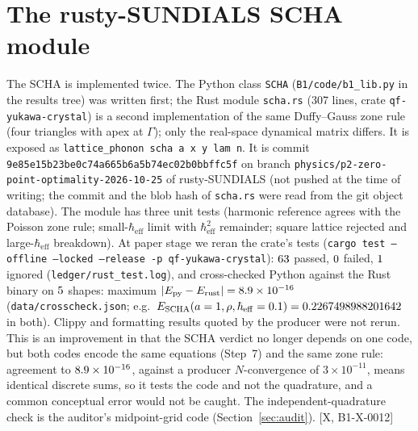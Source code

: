 \documentclass[10pt]{article}
\newcommand{\tier}[1]{\textsf{[#1]}}
\newcommand{\hb}{\hbar_{\mathrm{eff}}}
\begin{document}
\section{The rusty-SUNDIALS SCHA module}\label{sec:rust}
The SCHA is implemented twice. The Python class \texttt{SCHA} (\texttt{B1/code/b1\_lib.py} in the results tree) was written first; the Rust module \texttt{scha.rs} (307 lines, crate \texttt{qf-yukawa-crystal}) is a second implementation of the same Duffy--Gauss zone rule (four triangles with apex at $\Gamma$); only the real-space dynamical matrix differs. It is exposed as
\texttt{lattice\_phonon scha a x y lam n}. It is commit \texttt{9e85e15b23be0c74a665b6a5b74ec02b0bbffc5f} on branch \texttt{physics/p2-zero-point-optimality-2026-10-25} of rusty-SUNDIALS (not pushed at the time of writing; the commit and the blob hash of \texttt{scha.rs} were read from the git object database). The module has three unit tests (harmonic reference agrees with the Poisson zone rule; small-$\hb$ limit with $\hb^2$ remainder; square lattice rejected and large-$\hb$ breakdown).
At paper stage we reran the crate's tests (\texttt{cargo test --offline --locked --release -p qf-yukawa-crystal}): $63$ passed, $0$ failed, $1$ ignored (\texttt{ledger/rust\_test.log}), and cross-checked Python against the Rust binary on $5$ shapes: maximum $|E_{\rm py}-E_{\rm rust}|=8.9\times10^{-16}$ (\texttt{data/crosscheck.json}; e.g.\ $E_{\rm SCHA}(a=1,\rho,\hb=0.1)=0.2267498988201642$ in both).
Clippy and formatting results quoted by the producer were not rerun. This is an improvement in that the SCHA verdict no longer depends on one code, but both codes encode the same equations (Step~7) and the same zone rule: agreement to $8.9\times10^{-16}$, against a producer $N$-convergence of $3\times10^{-11}$, means identical discrete sums, so it tests the code and not the quadrature, and a common conceptual error would not be caught. The independent-quadrature check is the auditor's midpoint-grid code (Section~\ref{sec:audit}). \tier{X, B1-X-0012}

\end{document}
